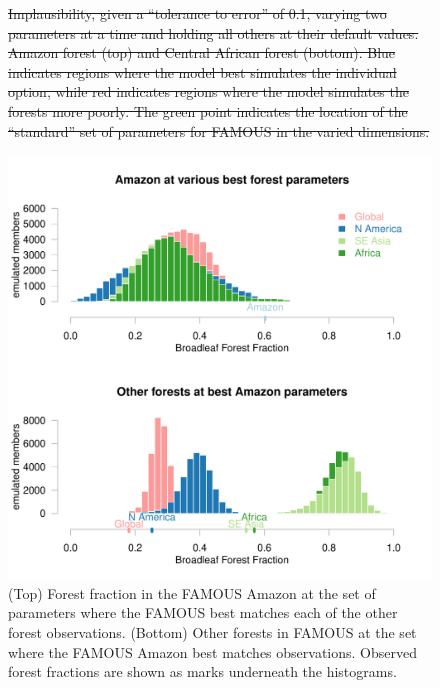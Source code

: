 \documentclass[esd, manuscript]{copernicus}
\providecommand{\DIFdel}[1]{{\protect\color{red}\sout{#1}}}                      %
\providecommand{\DIFdelFL}[1]{\DIFdel{#1}} %
\providecommand{\DIFdelbeginFL}{} %
\providecommand{\DIFdelendFL}{} %
\begin{document}
\begin{figure}[t]
\DIFdelbeginFL %
{%
\DIFdelFL{Implausibility, given a ``tolerance to error'' of 0.1, varying two parameters at a time and holding all others at their default values. Amazon forest (top) and Central African forest (bottom). Blue indicates regions where the model best simulates the individual option, while red indicates regions where the model simulates the forests more poorly. The green point indicates the location of the ``standard'' set of parameters for FAMOUS in the varied dimensions.}}

\DIFdelendFL \includegraphics[width=12cm]{graphics/best_inputs_swaps_hists_Paired.pdf}
\caption{(Top) Forest fraction in the FAMOUS Amazon at the set of parameters where the FAMOUS best matches each of the other forest observations. (Bottom) Other forests in FAMOUS at the set where the FAMOUS Amazon best matches observations. Observed forest fractions are shown as marks underneath the histograms.}
\label{fig:best_inputs_swaps_hists_Paired}
\end{figure}
\end{document}
